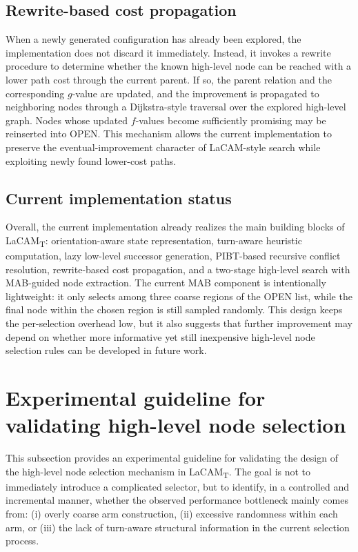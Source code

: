 \documentclass[lettersize,journal]{IEEEtran}
\begin{document}
\subsection{Rewrite-based cost propagation}
\label{subsec:impl_rewrite}

When a newly generated configuration has already been explored, the implementation does not discard it immediately. Instead, it invokes a rewrite procedure to determine whether the known high-level node can be reached with a lower path cost through the current parent. If so, the parent relation and the corresponding $g$-value are updated, and the improvement is propagated to neighboring nodes through a Dijkstra-style traversal over the explored high-level graph. Nodes whose updated $f$-values become sufficiently promising may be reinserted into OPEN. This mechanism allows the current implementation to preserve the eventual-improvement character of LaCAM-style search while exploiting newly found lower-cost paths.

\subsection{Current implementation status}
\label{subsec:impl_status}

Overall, the current implementation already realizes the main building blocks of LaCAM\textsubscript{T}: orientation-aware state representation, turn-aware heuristic computation, lazy low-level successor generation, PIBT-based recursive conflict resolution, rewrite-based cost propagation, and a two-stage high-level search with MAB-guided node extraction. The current MAB component is intentionally lightweight: it only selects among three coarse regions of the OPEN list, while the final node within the chosen region is still sampled randomly. This design keeps the per-selection overhead low, but it also suggests that further improvement may depend on whether more informative yet still inexpensive high-level node selection rules can be developed in future work.

\section{Experimental guideline for validating high-level node selection}
\label{subsec:exp_guideline_node_selection}

This subsection provides an experimental guideline for validating the design of the high-level node selection mechanism in LaCAM\textsubscript{T}. The goal is not to immediately introduce a complicated selector, but to identify, in a controlled and incremental manner, whether the observed performance bottleneck mainly comes from: (i) overly coarse arm construction, (ii) excessive randomness within each arm, or (iii) the lack of turn-aware structural information in the current selection process.
\end{document}
